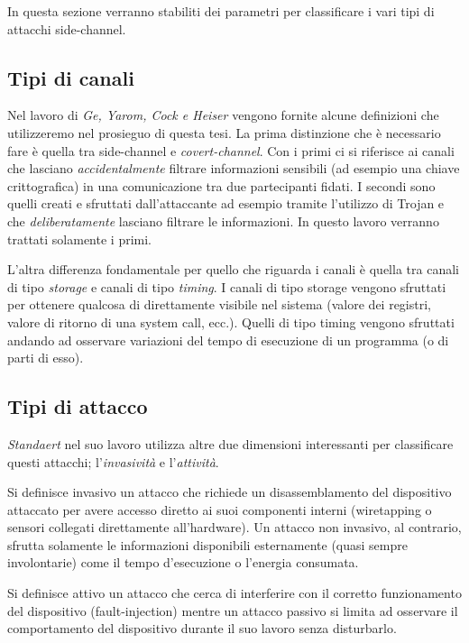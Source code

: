 		In questa sezione verranno stabiliti dei parametri per classificare i vari tipi di attacchi side-channel.
	
		\subsection{Tipi di canali}
	
			Nel lavoro di \emph{Ge, Yarom, Cock e Heiser}\cite{ge2016survey} vengono fornite alcune definizioni che utilizzeremo nel prosieguo di questa tesi. La prima distinzione che è necessario fare è quella tra side-channel e \emph{covert-channel}. Con i primi ci si riferisce ai canali che lasciano \emph{accidentalmente} filtrare informazioni sensibili (ad esempio una chiave crittografica) in una comunicazione tra due partecipanti fidati. I secondi sono quelli creati e sfruttati dall'attaccante ad esempio tramite l'utilizzo di Trojan e che \emph{deliberatamente} lasciano filtrare le informazioni. In questo lavoro verranno trattati solamente i primi.
			
			L'altra differenza fondamentale per quello che riguarda i canali è quella tra canali di tipo \emph{storage} e canali di tipo \emph{timing}. I canali di tipo storage vengono sfruttati per ottenere qualcosa di direttamente visibile nel sistema (valore dei registri, valore di ritorno di una system call, ecc.). Quelli di tipo timing vengono sfruttati andando ad osservare variazioni del tempo di esecuzione di un programma (o di parti di esso).
			
		\subsection{Tipi di attacco}
		
			\emph{Standaert} nel suo lavoro \cite{standaert2010introduction} utilizza altre due dimensioni interessanti per classificare questi attacchi; l'\emph{invasività} e l'\emph{attività}. 
			
			Si definisce invasivo un attacco che richiede un disassemblamento del dispositivo attaccato per avere accesso diretto ai suoi componenti interni (wiretapping o sensori collegati direttamente all'hardware). Un attacco non invasivo, al contrario, sfrutta solamente le informazioni disponibili esternamente (quasi sempre involontarie) come il tempo d'esecuzione o l'energia consumata.
			
			Si definisce attivo un attacco che cerca di interferire con il corretto funzionamento del dispositivo (fault-injection) mentre un attacco passivo si limita ad osservare il comportamento del dispositivo durante il suo lavoro senza disturbarlo. 
			
